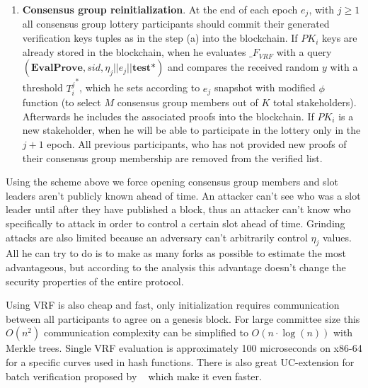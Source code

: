 \begin{enumerate}
    \item \textbf{Consensus group reinitialization}.
    At the end of each epoch $e_j$, with $j \geqslant 1$ all consensus group lottery participants should commit their generated verification keys tuples as in the step (a) into the blockchain.
    If $PK_i$ keys are already stored in the blockchain, when he evaluates ${\mathcal_{F}}_{VRF}$ with a query ${(\textbf{EvalProve}, sid, \eta_j || e_j || \textbf{test*})}$ and compares the received random $y$ with a threshold ${T_i^j}^*$, which he sets according to $e_j$ snapshot with modified $\phi$ function (to select $M$ consensus group members out of $K$ total stakeholders).
    Afterwards he includes the associated proofs into the blockchain.
    If $PK_i$ is a new stakeholder, when he will be able to participate in the lottery only in the $j+1$ epoch.
    All previous participants, who has not provided new proofs of their consensus group membership are removed from the verified list.
\end{enumerate}


Using the scheme above we force opening consensus group members and slot leaders aren't publicly known ahead of time.
An attacker can't see who was a slot leader until after they have published a block, thus an attacker can't know
who specifically to attack in order to control a certain slot ahead of time.
Grinding attacks are also limited because an adversary can't arbitrarily control $\eta_j$ values.
All he can try to do is to make as many forks as possible to estimate the most advantageous, but according to the analysis this advantage doesn't change the security properties of the entire protocol.

Using VRF is also cheap and fast, only initialization requires communication between all participants to agree on a genesis block.
For large committee size this $O(n^2)$ communication complexity can be simplified to $O(n \cdot \log(n))$ with Merkle trees.
Single VRF evaluation is approximately 100 microseconds on x86-64 for a specific curves used in hash functions.
There is also great UC-extension for batch verification proposed by ~\cite{cryptoeprint:2022/1045} which make it even faster.
